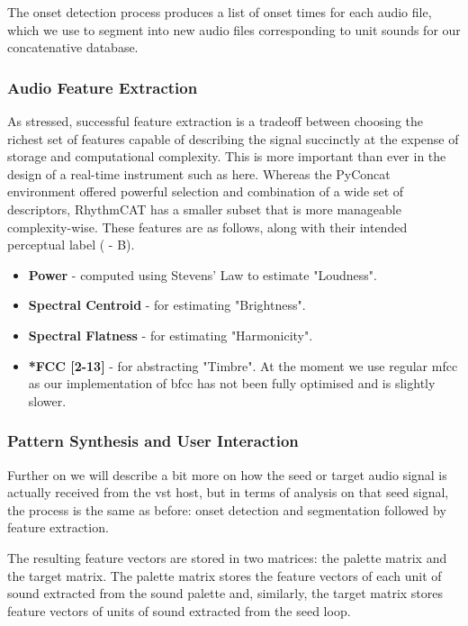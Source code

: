 The onset detection process produces a list of onset times for each audio file, which we use to segment into new audio files corresponding to unit sounds for our concatenative database.

\subsubsection{Audio Feature Extraction}

As stressed, successful feature extraction is a tradeoff between choosing the richest set of features capable of describing the signal succinctly at the expense of storage and computational complexity. This is more important than ever in the design of a real-time instrument such as here. Whereas the PyConcat environment offered powerful selection and combination of a wide set of descriptors, RhythmCAT has a smaller subset that is more manageable complexity-wise. These features are as follows, along with their intended perceptual label ( - B).
 
 \begin{itemize}
  \item \textbf{Power} - computed using Stevens' Law to estimate "Loudness".
  \item \textbf{Spectral Centroid} - for estimating "Brightness".
  \item \textbf{Spectral Flatness} - for estimating "Harmonicity".
  \item \textbf{*FCC [2-13]} - for abstracting "Timbre". At the moment we use regular \acrshort{mfcc} as our implementation of \acrshort{bfcc} has not been fully optimised and is slightly slower.
\end{itemize}

\subsubsection{Pattern Synthesis and User Interaction}

Further on we will describe a bit more on how the seed or target audio signal is actually received from the \acrshort{vst} host, but in terms of analysis on that seed signal, the process is the same as before: onset detection and segmentation followed by feature extraction.

The resulting feature vectors are stored in two matrices: the palette matrix and the target matrix. The palette matrix stores the feature vectors of each unit of sound extracted from the sound palette and, similarly, the target matrix stores feature vectors of units of sound extracted from the seed loop.

